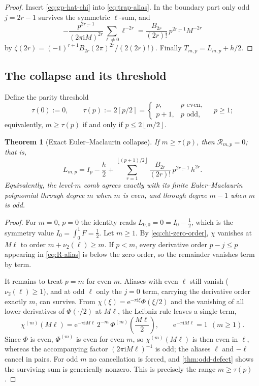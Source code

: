 \documentclass[11pt,oneside]{article}
\numberwithin{equation}{section}
\newtheorem{theorem}{Theorem}[section]
\theoremstyle{definition}
\theoremstyle{remark}
\newcommand{\e}{\mathrm e}
\newcommand{\ii}{\mathrm i}
\newcommand{\vtwo}{\nu_2}
\newcommand{\fall}[2]{#1^{\underline{#2}}}
\newcommand{\floor}[1]{\left\lfloor #1\right\rfloor}
\newcommand{\ceil}[1]{\left\lceil #1\right\rceil}
\newcommand{\defect}{\mathcal R}
\begin{document}
\begin{proof}
Insert \eqref{eq:gp-hat-chi} into \eqref{eq:trap-alias}.  In the
boundary part only odd $j=2r-1$ survives the symmetric $\ell$-sum, and
\[
 -\frac{\fall p{2r-1}}{(2\pi\ii M)^{2r}}\sum_{\ell\ne0}\ell^{-2r}
 =\frac{B_{2r}}{(2r)!}\,\fall p{2r-1}M^{-2r}
\]
by $\zeta(2r)=(-1)^{r+1}B_{2r}(2\pi)^{2r}/(2(2r)!)$.  Finally
$T_{m,p}=L_{m,p}+h/2$.
\end{proof}

\subsection{The collapse and its threshold}

Define the parity threshold
\begin{equation}
 \tau(0):=0,
 \qquad
 \tau(p):=2\ceil{p/2}
 =\begin{cases}p,&p\text{ even},\\ p+1,&p\text{ odd},\end{cases}
 \quad p\ge1;
 \label{eq:tau}
\end{equation}
equivalently, $m\ge\tau(p)$ if and only if $p\le2\floor{m/2}$.

\begin{theorem}[Exact Euler--Maclaurin collapse]
\label{thm:EM-collapse}
If $m\ge\tau(p)$, then $\defect_{m,p}=0$; that is,
\begin{equation}
 \boxed{\;
 L_{m,p}=I_p-\frac h2+
 \sum_{r=1}^{\floor{(p+1)/2}}
 \frac{B_{2r}}{(2r)!}\,\fall p{2r-1}\,h^{2r}.
 \;}
 \label{eq:EM-collapse}
\end{equation}
Equivalently, the level-$m$ comb agrees exactly with its finite
Euler--Maclaurin polynomial through degree $m$ when $m$ is even, and
through degree $m-1$ when $m$ is odd.
\end{theorem}

\begin{proof}
For $m=0$, $p=0$ the identity reads $L_{0,0}=0=I_0-\tfrac12$, which is
the symmetry value $I_0=\int_0^1F=\tfrac12$.  Let $m\ge1$.  By
\eqref{eq:chi-zero-order}, $\chi$ vanishes at $M\ell$ to order
$m+\vtwo(\ell)\ge m$.  If $p<m$, every derivative order $p-j\le p$
appearing in \eqref{eq:R-alias} is below the zero order, so the
remainder vanishes term by term.

It remains to treat $p=m$ for even $m$.  Aliases with even $\ell$
still vanish ($\vtwo(\ell)\ge1$), and at odd $\ell$ only the $j=0$
term, carrying the derivative order exactly $m$, can survive.  From
$\chi(\xi)=\e^{-\pi\ii\xi}\Phi(\xi/2)$ and the vanishing of all lower
derivatives of $\Phi(\cdot/2)$ at $M\ell$, the Leibniz rule leaves a
single term,
\[
 \chi^{(m)}(M\ell)
 =\e^{-\pi\ii M\ell}\,2^{-m}\,
 \Phi^{(m)}\!\left(\frac{M\ell}{2}\right),
 \qquad
 \e^{-\pi\ii M\ell}=1\ \ (m\ge1).
\]
Since $\Phi$ is even, $\Phi^{(m)}$ is even for even $m$, so
$\chi^{(m)}(M\ell)$ is then even in $\ell$, whereas the accompanying
factor $(2\pi\ii M\ell)^{-1}$ is odd; the aliases $\ell$ and $-\ell$
cancel in pairs.  For odd $m$ no cancellation is forced, and
\cref{thm:odd-defect} shows the surviving sum is generically nonzero.
This is precisely the range $m\ge\tau(p)$.
\end{proof}
\end{document}

